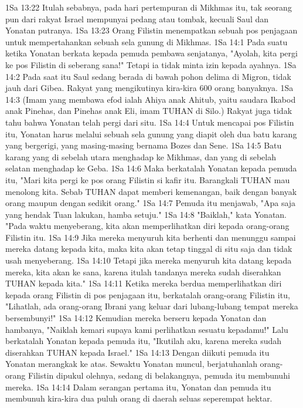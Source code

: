 1Sa 13:22  Itulah sebabnya, pada hari pertempuran di Mikhmas itu, tak seorang pun dari rakyat Israel mempunyai pedang atau tombak, kecuali Saul dan Yonatan putranya.
1Sa 13:23  Orang Filistin menempatkan sebuah pos penjagaan untuk mempertahankan sebuah sela gunung di Mikhmas.
1Sa 14:1  Pada suatu ketika Yonatan berkata kepada pemuda pembawa senjatanya, "Ayolah, kita pergi ke pos Filistin di seberang sana!" Tetapi ia tidak minta izin kepada ayahnya.
1Sa 14:2  Pada saat itu Saul sedang berada di bawah pohon delima di Migron, tidak jauh dari Gibea. Rakyat yang mengikutinya kira-kira 600 orang banyaknya.
1Sa 14:3  (Imam yang membawa efod ialah Ahiya anak Ahitub, yaitu saudara Ikabod anak Pinehas, dan Pinehas anak Eli, imam TUHAN di Silo.) Rakyat juga tidak tahu bahwa Yonatan telah pergi dari situ.
1Sa 14:4  Untuk mencapai pos Filistin itu, Yonatan harus melalui sebuah sela gunung yang diapit oleh dua batu karang yang bergerigi, yang masing-masing bernama Bozes dan Sene.
1Sa 14:5  Batu karang yang di sebelah utara menghadap ke Mikhmas, dan yang di sebelah selatan menghadap ke Geba.
1Sa 14:6  Maka berkatalah Yonatan kepada pemuda itu, "Mari kita pergi ke pos orang Filistin si kafir itu. Barangkali TUHAN mau menolong kita. Sebab TUHAN dapat memberi kemenangan, baik dengan banyak orang maupun dengan sedikit orang."
1Sa 14:7  Pemuda itu menjawab, "Apa saja yang hendak Tuan lakukan, hamba setuju."
1Sa 14:8  "Baiklah," kata Yonatan. "Pada waktu menyeberang, kita akan memperlihatkan diri kepada orang-orang Filistin itu.
1Sa 14:9  Jika mereka menyuruh kita berhenti dan menunggu sampai mereka datang kepada kita, maka kita akan tetap tinggal di situ saja dan tidak usah menyeberang.
1Sa 14:10  Tetapi jika mereka menyuruh kita datang kepada mereka, kita akan ke sana, karena itulah tandanya mereka sudah diserahkan TUHAN kepada kita."
1Sa 14:11  Ketika mereka berdua memperlihatkan diri kepada orang Filistin di pos penjagaan itu, berkatalah orang-orang Filistin itu, "Lihatlah, ada orang-orang Ibrani yang keluar dari lubang-lubang tempat mereka bersembunyi!"
1Sa 14:12  Kemudian mereka berseru kepada Yonatan dan hambanya, "Naiklah kemari supaya kami perlihatkan sesuatu kepadamu!" Lalu berkatalah Yonatan kepada pemuda itu, "Ikutilah aku, karena mereka sudah diserahkan TUHAN kepada Israel."
1Sa 14:13  Dengan diikuti pemuda itu Yonatan merangkak ke atas. Sewaktu Yonatan muncul, berjatuhanlah orang-orang Filistin dipukul olehnya, sedang di belakangnya, pemuda itu membunuhi mereka.
1Sa 14:14  Dalam serangan pertama itu, Yonatan dan pemuda itu membunuh kira-kira dua puluh orang di daerah seluas seperempat hektar.
